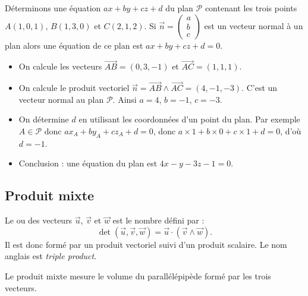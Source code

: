 \documentclass[11pt,class=report,crop=false]{standalone}
\begin{document}
\begin{exemple}
Déterminons une équation $ax+by+cz+d$ du plan $\mathcal{P}$ contenant les trois points $A(1,0,1)$, $B(1,3,0)$ et $C(2,1,2)$.
Si $\vec n = \left(\begin{smallmatrix}
    a \\ b \\ c    
\end{smallmatrix}\right)$ est un vecteur normal à un plan alors une équation de ce plan est $ax+by+cz+d=0$.


\begin{itemize}
    \item On calcule les vecteurs $\vec{AB} = (0,3,-1)$ et $\vec{AC} =(1,1,1)$.
    \item On calcule le produit vectoriel $\vec n = \vec{AB} \wedge \vec{AC} = (4,-1,-3)$. C'est un vecteur normal au plan $\mathcal{P}$.
    Ainsi $a=4$, $b=-1$, $c=-3$.
    \item On détermine $d$ en utilisant les coordonnées d'un point du plan. Par exemple  $A \in \mathcal{P}$ donc $a x_A + b y_A + c z_A+d=0$, donc $a \times 1 + b \times 0 + c \times 1+d=0$, d'où $d=-1$.
    \item Conclusion : une équation du plan est $4x-y-3z-1=0$.
\end{itemize}

\end{exemple}


\subsection{Produit mixte}

Le  ou  des vecteurs $\vec u$, $\vec v$ et $\vec w$ est le nombre défini par :
$$\det(\vec u, \vec v, \vec w) = \vec u \cdot (\vec v \wedge \vec w).$$
Il est donc formé par un produit vectoriel suivi d'un produit scalaire. Le nom anglais est \emph{triple product}.
\begin{proposition}
Le produit mixte mesure le volume du parallélépipède formé par les trois vecteurs.
\end{proposition}

\end{document}
